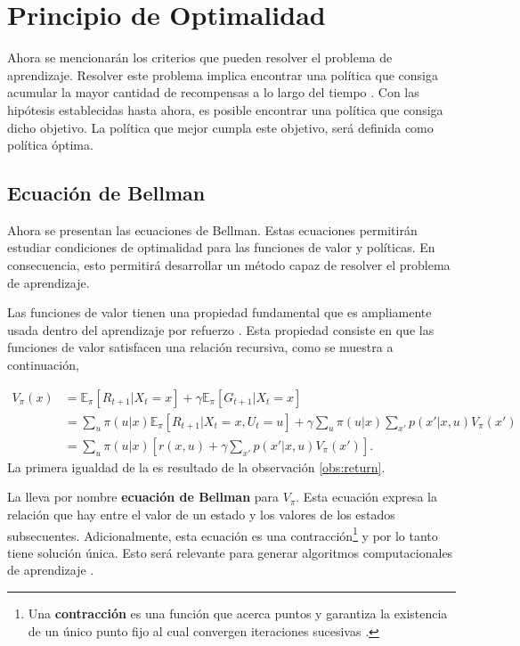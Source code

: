 \section{Principio de Optimalidad}

Ahora se mencionarán los criterios que pueden resolver el problema de aprendizaje. Resolver este problema implica encontrar una política que consiga acumular la mayor cantidad de recompensas a lo largo del tiempo \cite{Sutton2018}. Con las hipótesis establecidas hasta ahora, es posible encontrar una política que consiga dicho objetivo. La política que mejor cumpla este objetivo, será definida como política óptima.

\subsection{Ecuación de Bellman}
Ahora se presentan las ecuaciones de Bellman. Estas ecuaciones permitirán estudiar condiciones de optimalidad para las funciones de valor y políticas. En consecuencia, esto permitirá desarrollar un método capaz de resolver el problema de aprendizaje.

 Las funciones de valor tienen una propiedad fundamental que es ampliamente usada dentro del aprendizaje por refuerzo \cite{Sutton2018}. Esta propiedad consiste en que las funciones de valor satisfacen una relación recursiva, como se muestra a continuación, 

\begin{equation}
\begin{aligned}
    V_{\pi}(x) &= \mathbb{E}_{\pi}[R_{t+1}|X_t=x] + \gamma\mathbb{E}_{\pi}[G_{t+1}|X_t=x] \\
    &= \sum_{u}\pi(u|x) \mathbb{E}_{\pi}[R_{t+1}|X_t=x, U_t=u] + \gamma \sum_{u}\pi(u|x)\sum_{x'}p(x'|x, u)V_{\pi}(x') \\
    &= \sum_{u}\pi(u|x)\left[r(x,u) + \gamma \sum_{x'}p(x'|x,u)V_{\pi}(x')\right].
\end{aligned}
\label{eq:Bellman_V}
\end{equation}
La primera igualdad de la  es resultado de la observación \ref{obs:return}.

La  lleva por nombre \textbf{ecuación de Bellman} para $V_{\pi}$. Esta ecuación expresa la relación que hay entre el valor de un estado y los valores de los estados subsecuentes. Adicionalmente, esta ecuación es una contracción\footnote{Una \textbf{contracción} es una función que acerca puntos y garantiza la existencia de un único punto fijo al cual convergen iteraciones sucesivas \cite{clapp2015}.} y por lo tanto tiene solución única. Esto será relevante para generar algoritmos computacionales de aprendizaje \cite{Shiyu2022}.

